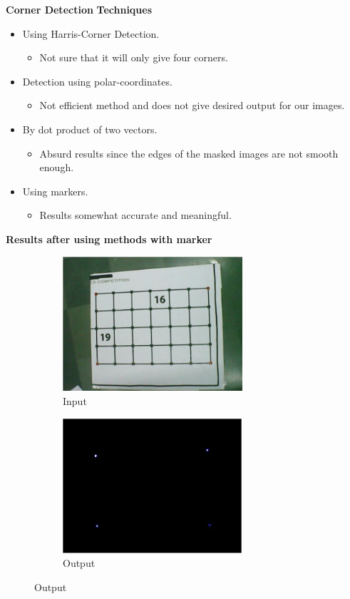 \documentclass[10pt, a4paper]{beamer}
\begin{document}
\begin{frame}
	\textbf{Corner Detection}
	\textbf{Techniques}
	\begin{itemize}
		\item {Using Harris-Corner Detection.}\\
		\begin{itemize}
			\item Not sure that it will only give four corners.
		\end{itemize}
		\item {Detection using polar-coordinates.}
		\begin{itemize}
			\item Not efficient method and does not give desired output for our images.
		\end{itemize}
		\item {By dot product of two vectors.}
		\begin{itemize}
			\item Absurd results since the edges of the masked images are not smooth enough.
		\end{itemize}
		\item {Using markers.}
		\begin{itemize}
			\item Results somewhat accurate and meaningful.
		\end{itemize}
	\end{itemize}	
\end{frame}
\begin{frame}
	\textbf{Results after using methods with marker}
	\begin{figure}[h!]
		\begin{subfigure}{0.4\textwidth}
			\includegraphics[width=1\linewidth, height=5cm]{Filtering/cornerdetection/1.jpg}
			\caption{Input}
		\end{subfigure}
		\begin{subfigure}{0.4\textwidth}
			\includegraphics[width=1\linewidth, height=5cm]{Filtering/cornerdetection/2.jpg}
			\caption{Output}
		\end{subfigure}
	\end{figure}	
\end{frame}
\end{document}
